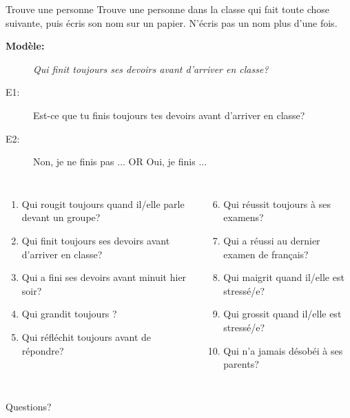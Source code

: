 \documentclass{beamer}
\begin{document}
  \begin{frame}{Trouve une personne}
    Trouve une personne dans la classe qui fait toute chose suivante, puis écris son nom sur un papier.
    N'écris pas un nom plus d'une fois.
    \begin{description}
      \item[\textbf{Modèle:}] \emph{Qui finit toujours ses devoirs avant d'arriver en classe?}
      \item[E1:] Est-ce que tu finis toujours tes devoirs avant d'arriver en classe?
      \item[E2:] Non, je ne finis pas ... OR Oui, je finis ...
    \end{description}
    \begin{columns}[t]
      \scriptsize
        \begin{enumerate}
          \item Qui rougit toujours quand il/elle parle devant un groupe?
          \item Qui finit toujours ses devoirs avant d'arriver en classe?
          \item Qui a fini ses devoirs avant minuit hier soir?
          \item Qui grandit toujours ?
          \item Qui réfléchit toujours avant de répondre?
        \end{enumerate}
        \begin{enumerate}
          \setcounter{enumi}{5}
          \item Qui réussit toujours à ses examens?
          \item Qui a réussi au dernier examen de français?
          \item Qui maigrit quand il/elle est stressé/e?
          \item Qui grossit quand il/elle est stressé/e?
          \item Qui n'a jamais désobéi à ses parents?
        \end{enumerate}
    \end{columns}
  \end{frame}

  \begin{frame}{}
    \begin{center}
      \Large Questions?
    \end{center}
  \end{frame}
\end{document}
